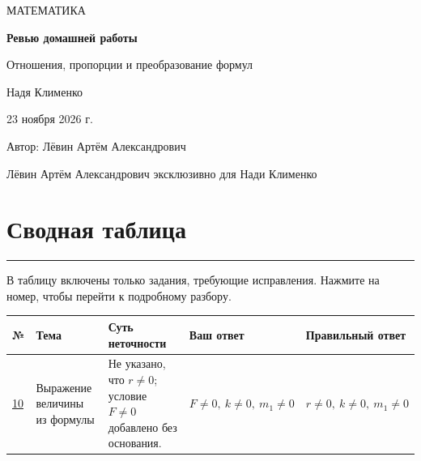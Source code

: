 \documentclass[a4paper,12pt]{article}
\newcommand{\accentline}{\par\noindent\textcolor{accent}{\rule{\linewidth}{0.45pt}}\par}
\begin{document}

\begin{titlepage}
  \thispagestyle{empty}
  \begin{center}
    \vspace*{36mm}
    {\small\textcolor{muted}{МАТЕМАТИКА}\par}
    \vspace{24mm}
    {\Huge\bfseries\textcolor{darkaccent}{Ревью домашней работы}\par}
    \vspace{17mm}
    {\Large Отношения, пропорции и преобразование формул\par}
    \vspace{32mm}
    {\large Надя Клименко\par}
    \vspace{18mm}
    {\normalsize 23 ноября 2026 г.\par}
    \vfill
    {\small Автор: Лёвин Артём Александрович\par}
    \vspace{3mm}
    {\small\textcolor{muted}{Лёвин Артём Александрович эксклюзивно для Нади Клименко}\par}
    \vspace{12mm}
  \end{center}
\end{titlepage}

\clearpage
\section*{\textcolor{darkaccent}{Сводная таблица}}
\accentline

В таблицу включены только задания, требующие исправления. Нажмите на номер,
чтобы перейти к подробному разбору.

\small
\begin{tabularx}{\linewidth}{@{}p{12mm}p{28mm}X p{28mm}p{31mm}@{}}
\toprule
\textbf{№} & \textbf{Тема} & \textbf{Суть неточности} &
\textbf{Ваш ответ} & \textbf{Правильный ответ}\\
\midrule
\hyperref[task:10]{10} & Выражение величины
из формулы &
Не указано, что \(r\ne0\); условие \(F\ne0\) добавлено без основания. &
\(F\ne0,\ k\ne0,\ m_1\ne0\) &
\(r\ne0,\ k\ne0,\ m_1\ne0\)\\
\bottomrule
\end{tabularx}
\normalsize
\end{document}
